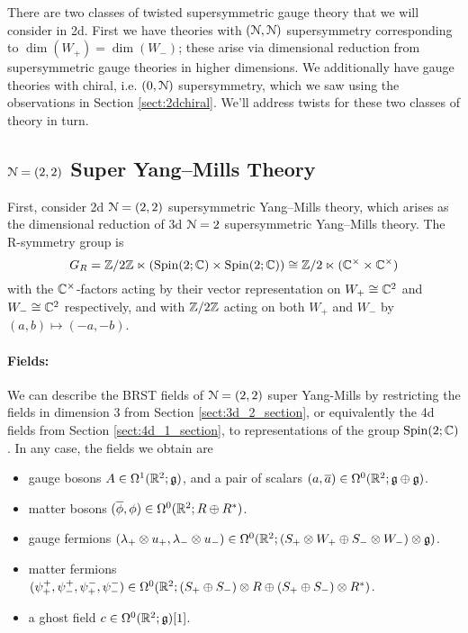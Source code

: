 \documentclass[10pt, oneside]{article}
\begin{document}
There are two classes of twisted supersymmetric gauge theory that we will consider in 2d.  First we have theories with $(\mathcal{N}, \mathcal{N})$ supersymmetry corresponding to $\dim(W_+) = \dim(W_-)$; these arise via dimensional reduction from supersymmetric gauge theories in higher dimensions.  We additionally have gauge theories with chiral, i.e. $(0,\mathcal{N})$ supersymmetry, which we saw using the observations in Section \ref{sect:2dchiral}.  
We'll address twists for these two classes of theory in turn.

\subsection{\texorpdfstring{$\mathcal N=(2,2)$}{N=(2,2)} Super Yang--Mills Theory} \label{sect:2d(2,2)}
First, consider 2d $\mathcal{N}=(2,2)$ supersymmetric Yang--Mills theory, which arises as the dimensional reduction of 3d $\mathcal{N}=2$ supersymmetric Yang--Mills theory.  The R-symmetry group is $$G_R = \mathbb Z/2\mathbb Z \ltimes (\mathrm{Spin}(2;\mathbb C) \times \mathrm{Spin}(2;\mathbb C)) \cong \mathbb Z/2 \ltimes ( \mathbb C^\times \times \mathbb C^\times)$$ with the $\mathbb C^\times$-factors acting by their vector representation on $W_+ \cong \mathbb C^2$ and $W_- \cong \mathbb C^2$ respectively, and with $\mathbb Z/2\mathbb Z$ acting on both $W_+$ and $W_-$ by $(a,b) \mapsto (-a, -b)$. 

\vspace{-10pt}
\paragraph{Fields:} We can describe the BRST fields of $\mathcal{N}=(2,2)$ super Yang-Mills by restricting the fields in dimension 3 from Section \ref{sect:3d_2_section}, or equivalently the 4d fields from Section \ref{sect:4d_1_section}, to representations of the group $\mathrm{Spin}(2;\mathbb C)$.  
In any case, the fields we obtain are
\begin{itemize}
 \item gauge bosons $A \in \Omega^1(\mathbb R^2; \mathfrak{g})$, and a pair of scalars $(a, \overline{a}) \in \Omega^0(\mathbb R^2; \mathfrak{g} \oplus \mathfrak{g})$.
 \item matter bosons $(\overline{\phi}, \phi) \in \Omega^0(\mathbb R^2 ; R \oplus R^*)$.
 \item gauge fermions $(\lambda_+ \otimes u_+,\lambda_- \otimes u_-) \in \Omega^0(\mathbb R^2 ; (S_+ \otimes W_+ \oplus S_- \otimes W_-) \otimes \mathfrak{g})$.
 \item matter fermions $(\psi^+_+,\psi^+_-, \psi^-_+, \psi^-_-) \in \Omega^0(\mathbb R^2 ; (S_+ \oplus S_-) \otimes R \oplus (S_+ \oplus S_-) \otimes R^*)$.
 \item a ghost field $c \in \Omega^0(\mathbb R^2; \mathfrak{g})[1]$.
\end{itemize}
\end{document}
